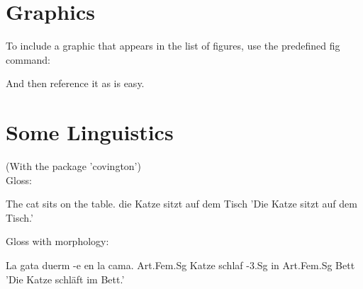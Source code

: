 \section{Graphics}

To include a graphic that appears in the list of figures, use the predefined fig command:\\

And then reference it as  is easy.

\section{Some Linguistics}

(With the package 'covington')\\

Gloss:

\begin{examples}
 \item \gll The cat sits on the table.
	    die Katze sitzt auf dem Tisch
	\glt 'Die Katze sitzt auf dem Tisch.'
    \glend
\end{examples}

Gloss with morphology:

\begin{examples}
 \item \gll La gata duerm -e en la cama.
	    Art.Fem.Sg Katze schlaf -3.Sg in Art.Fem.Sg Bett
	\glt 'Die Katze schl\"aft im Bett.'
    \glend
\end{examples}

